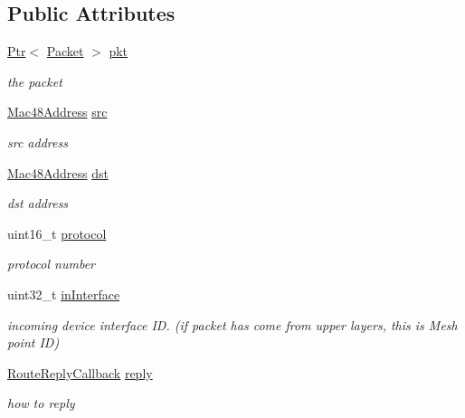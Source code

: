 \subsection*{Public Attributes}
\begin{DoxyCompactItemize}
\item 
\hyperlink{classns3_1_1Ptr}{Ptr}$<$ \hyperlink{classns3_1_1Packet}{Packet} $>$ \hyperlink{structns3_1_1dot11s_1_1HwmpProtocol_1_1QueuedPacket_ad313ffb587733d3750ba16f9a2a09713}{pkt}
\begin{DoxyCompactList}\small\item\em the packet \end{DoxyCompactList}\item 
\hyperlink{classns3_1_1Mac48Address}{Mac48\+Address} \hyperlink{structns3_1_1dot11s_1_1HwmpProtocol_1_1QueuedPacket_a82321b28b0bac4ebd029b60927b3d246}{src}
\begin{DoxyCompactList}\small\item\em src address \end{DoxyCompactList}\item 
\hyperlink{classns3_1_1Mac48Address}{Mac48\+Address} \hyperlink{structns3_1_1dot11s_1_1HwmpProtocol_1_1QueuedPacket_a664c53e3a98d240506a83641bf94e12b}{dst}
\begin{DoxyCompactList}\small\item\em dst address \end{DoxyCompactList}\item 
uint16\+\_\+t \hyperlink{structns3_1_1dot11s_1_1HwmpProtocol_1_1QueuedPacket_a5181acce44c93a82a61c557409347984}{protocol}
\begin{DoxyCompactList}\small\item\em protocol number \end{DoxyCompactList}\item 
uint32\+\_\+t \hyperlink{structns3_1_1dot11s_1_1HwmpProtocol_1_1QueuedPacket_a81d6fde715ecc2f22c985bd47e46b3d6}{in\+Interface}
\begin{DoxyCompactList}\small\item\em incoming device interface ID. (if packet has come from upper layers, this is Mesh point ID) \end{DoxyCompactList}\item 
\hyperlink{classns3_1_1MeshL2RoutingProtocol_a4c415efa22789b3a3bb5538b8fcf3e6a}{Route\+Reply\+Callback} \hyperlink{structns3_1_1dot11s_1_1HwmpProtocol_1_1QueuedPacket_a7125c4d25f173fa8954bc88ce0309444}{reply}
\begin{DoxyCompactList}\small\item\em how to reply \end{DoxyCompactList}\end{DoxyCompactItemize}


